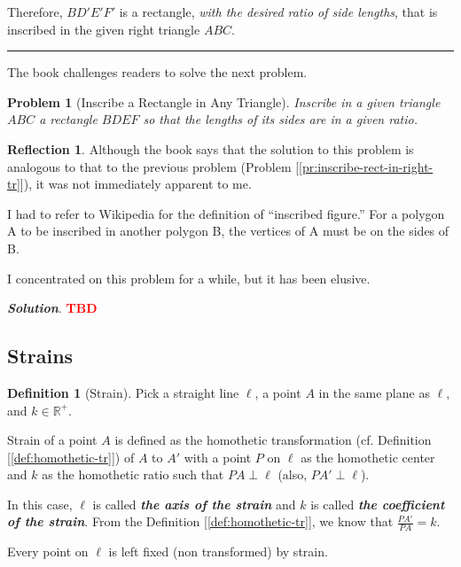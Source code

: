 \documentclass[11pt]{article}
\theoremstyle{definition}
\newtheorem{definition}{Definition}
\theoremstyle{plain}
\theoremstyle{problemstyle}
\newtheorem{problem}{Problem}
\theoremstyle{remark}
\theoremstyle{definition}
\newtheorem{reflection}{Reflection}
\begin{document}
Therefore, $BD'E'F'$ is a rectangle, \emph{with the desired ratio of side lengths}, that is inscribed in the given right triangle $ABC$.

\noindent\rule{\linewidth}{0.4pt}


The book challenges readers to solve the next problem. 

\begin{problem}[Inscribe a Rectangle in Any Triangle]\label{pr:inscribe-rect-in-any-tr}
    \emph{Inscribe} in a given triangle $ABC$ a rectangle $BDEF$ so that the lengths of its sides are in a given ratio.
\end{problem}
\begin{reflection}
    Although the book says that the solution to this problem is analogous to that to the previous problem (Problem [\ref{pr:inscribe-rect-in-right-tr}]), it was not immediately apparent to me.

    I had to refer to Wikipedia \cite{wiki:inscribed-fig} for the definition of ``inscribed figure.'' For a polygon A to be inscribed in another polygon B, the vertices of A must be on the sides of B. 

    I concentrated on this problem for a while, but it has been elusive. 
\end{reflection}

\textbf{\emph{Solution}}. \textcolor{red}{\textbf{TBD}} 



\subsection{Strains}
\begin{definition}[Strain]\label{def:strain}
    Pick a straight line $\ell$, a point $A$ in the same plane as $\ell$, and $k\in\mathbb{R^+}$.

    Strain of a point $A$ is defined as the homothetic transformation (cf. Definition [\ref{def:homothetic-tr}]) of $A$ to $A'$ with a point $P$ on $\ell$ as the homothetic center and $k$ as the homothetic ratio such that $PA\perp\ell$ (also, $PA'\perp\ell$).

    In this case, $\ell$ is called \emph{\textbf{the axis of the strain}} and $k$ is called \emph{\textbf {the coefficient of the strain}}. From the Definition [\ref{def:homothetic-tr}], we know that $\frac{PA'}{PA}=k$.
\end{definition}

Every point on $\ell$ is left fixed (non transformed) by strain.
\end{document}
